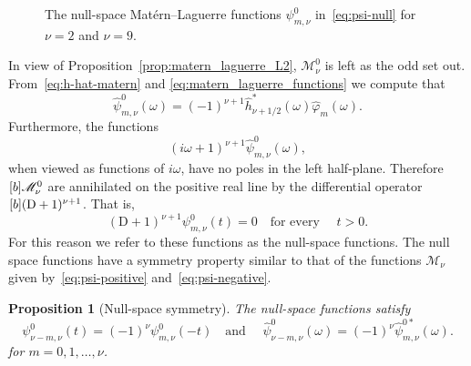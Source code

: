 \documentclass{article}
\newtheorem{proposition}{Proposition}
{\theorembodyfont{\rmfamily}\newtheorem{remark}{Remark}}
\begin{document}
\begin{figure}[h]
  \begin{center}
    \label{fig:matern-null-space}
  \end{center}
  \caption{The null-space Mat{\'e}rn--Laguerre functions $\psi_{m, \nu}^0$
  in~\eqref{eq:psi-null} for $\nu = 2$ and $\nu = 9$.}
\end{figure}

In view of  Proposition~\ref{prop:matern_laguerre_L2}, $\mathscr{M}_{\nu}^0$
is left as the odd set out. From~\eqref{eq:h-hat-matern} and
\eqref{eq:matern_laguerre_functions} we compute that
\[ \label{eq:nullspace_functions} \hat{\psi}^0_{m, \nu} (\omega) = (- 1)^{\nu
   + 1}  \hat{h}_{\nu + 1 / 2}^{\ast} (\omega)  \hat{\varphi}_m (\omega) . \]
Furthermore, the functions
\[ (i \omega + 1)^{\nu + 1}  \hat{\psi}^0_{m, \nu} (\omega), \]
when viewed as functions of $i \omega$, have no poles in the left half-plane.
Therefore $\smash{[} b] \mathscr{M}_{\nu}^0$ are annihilated on the positive
real line by the differential operator $\smash{[} b] (\mathrm{D} + 1)^{\nu +
1}$. That is,
\[ (\mathrm{D} + 1)^{\nu + 1} \psi_{m, \nu}^0 (t) = 0 \quad \text{for every }
   \quad t > 0. \]
For this reason we refer to these functions as the null-space functions. The
null space functions have a symmetry property similar to that of the functions
$\mathscr{M}_{\nu}$ given by~\eqref{eq:psi-positive}
and~\eqref{eq:psi-negative}.

\begin{proposition}
  [Null-space symmetry] The null-space functions satisfy
  \[ \psi^0_{\nu - m, \nu} (t) = (- 1)^{\nu} \psi^0_{m, \nu}  (- t)  \quad
     \text{and } \quad \hat{\psi}^0_{\nu - m, \nu} (\omega) = (- 1)^{\nu} 
     \hat{\psi}^{0 \ast}_{m, \nu} (\omega) . \]
  for $m = 0, 1, \ldots, \nu$.
\end{proposition}
\end{document}
